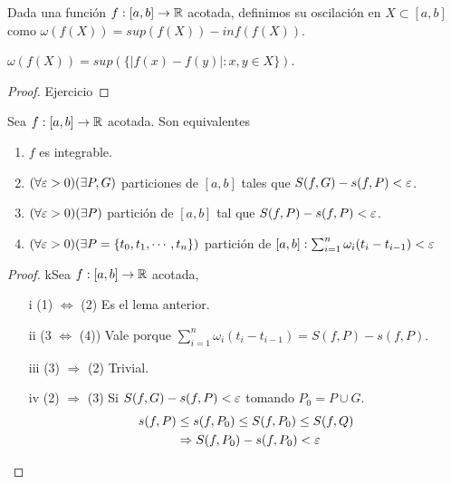 \begin{definition}[Oscilación]
  Dada una función $f: [a, b] \to \mathbb{R}$ acotada, definimos su oscilación en $X \subset [a, b]$ como $\omega(f(X)) = sup(f(X)) - inf(f(X))$.
\end{definition}

\begin{note}
  $\omega(f(X)) = sup(\{ |f(x) - f(y)| : x,y \in X \})$.
  \begin{proof}
    Ejercicio
  \end{proof}
\end{note}

\clearpage

\begin{theorem}
  Sea $f: [a, b] \to \mathbb{R}$ acotada. Son equivalentes \begin{enumerate}
    \item $f$ es integrable.
    \item $(\forall \varepsilon > 0)(\exists P, G)$ particiones de $[a, b]$ tales que $S(f, G) - s(f, P) < \varepsilon$.
    \item $(\forall \varepsilon > 0)(\exists P)$ partición de $[a, b]$ tal que $S(f, P) - s(f, P) < \varepsilon$.
    \item $(\forall \varepsilon > 0)(\exists P = \{ t_0, t_1, \cdots, t_n \})$ partición de $[a, b] : \sum_{i = 1}^n \omega_i (t_i - t_{i-1}) < \varepsilon$
  \end{enumerate}

  \begin{proof}
    kSea $f: [a,b] \to \mathbb{R}$ acotada,
    \begin{enumerate}
      \item[i] (1) $\iff$ (2) Es el lema anterior.
      \item[ii] (3 $\iff$ (4)) Vale porque $\sum_{i = 1}^n \omega_i (t_i - t_{i-1}) = S(f, P) - s(f, P)$.
      \item[iii] (3) $\Rightarrow$ (2) Trivial.
      \item[iv] (2) $\Rightarrow$ (3) Si $S(f, G) - s(f, P) < \varepsilon$ tomando $P_0 = P \cup G$. \begin{align*}
              s(f, P) & \leq s(f, P_0) \leq S(f, P_0) \leq S(f, Q) \\
                      & \Rightarrow S(f, P_0) - s(f, P_0) < \varepsilon
            \end{align*}
    \end{enumerate}
  \end{proof}
\end{theorem}

\clearpage

